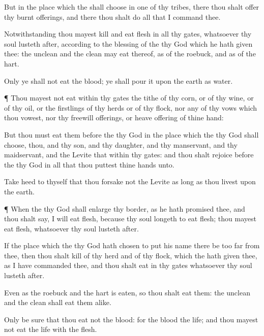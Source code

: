 {But in the
place which the
{} shall
choose in
one of thy
tribes, there thou shalt
offer thy burnt
offerings, and there thou shalt
do all that I
command thee.

Notwithstanding thou mayest
kill and
eat
flesh in all thy
gates, whatsoever thy
soul lusteth
after, according to the
blessing of the
{} thy
God which he hath
given thee: the
unclean and the
clean may
eat thereof, as of the
roebuck, and as of the
hart.

Only ye shall not
eat the
blood; ye shall
pour it upon the
earth as
water.


\par }{\PP {}¶ Thou
mayest not
eat within thy
gates the
tithe of thy
corn, or of thy
wine, or of thy
oil, or the
firstlings of thy
herds or of thy
flock, nor any of thy
vows which thou
vowest, nor thy freewill
offerings, or heave
offering of thine
hand:

But thou must
eat them
before the
{} thy
God in the
place which the
{} thy
God shall
choose, thou, and thy
son, and thy
daughter, and thy
manservant, and thy
maidservant, and the
Levite that
{} within thy
gates: and thou shalt
rejoice
before the
{} thy
God in all that thou
puttest thine
hands unto.

Take
heed to thyself that thou
forsake not the
Levite as long as thou
livest upon the
earth.


\par }{\PP {}¶ When the
{} thy
God shall
enlarge thy
border, as he hath
promised thee, and thou shalt
say, I will
eat
flesh, because thy
soul
longeth to
eat
flesh; thou mayest
eat
flesh, whatsoever thy
soul lusteth
after.

If the
place which the
{} thy
God hath
chosen to
put his
name there be too
far from thee, then thou shalt
kill of thy
herd and of thy
flock, which the
{} hath
given thee, as I have
commanded thee, and thou shalt
eat in thy
gates whatsoever thy
soul lusteth
after.

Even as the
roebuck and the
hart is
eaten, so thou shalt
eat them: the
unclean and the
clean shall
eat
{} them
alike.

Only be
sure that thou
eat not the
blood: for the
blood
{} the
life; and thou mayest not
eat the
life with the
flesh.

}
